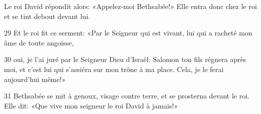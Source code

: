 Le roi David répondit alors: «Appelez-moi Bethsabée!» Elle entra donc chez le roi et se tint debout devant lui.

29 Et le roi fit ce serment: «Par le Seigneur qui est vivant, lui qui a racheté mon âme de toute angoisse,

30 oui, je l’ai juré par le Seigneur Dieu d’Israël: Salomon ton fils régnera après moi, et c’est lui qui s’assiéra sur mon trône à ma place. Cela, je le ferai aujourd’hui même!»

31 Bethsabée se mit à genoux, visage contre terre, et se prosterna devant le roi. Elle dit: «Que vive mon seigneur le roi David à jamais!»
